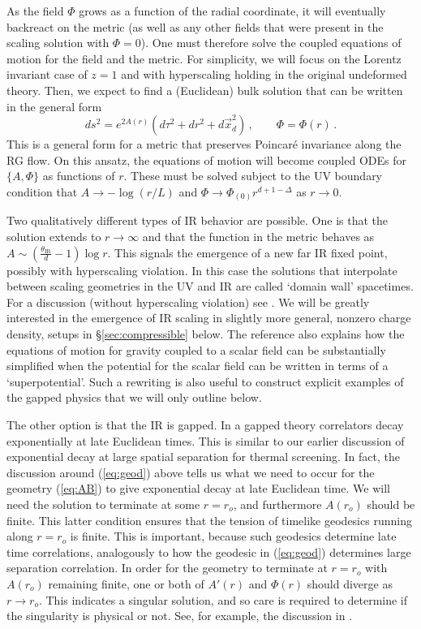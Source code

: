 \documentclass[10pt, oneside]{book}
\def\be{\begin{equation}}
\def\ee{\end{equation}}
\begin{document}
\begin{doublespace}
As the field $\Phi$ grows as a function of the radial coordinate, it will eventually backreact on the metric (as well as any other fields that were present in the scaling solution with $\Phi = 0$). One must therefore solve the coupled equations of motion for the field and the metric. For simplicity, we will focus on the Lorentz invariant case of $z=1$ and with hyperscaling holding in the original undeformed theory. Then, we expect to find a (Euclidean) bulk solution that can be written in the general form 
\be\label{eq:AB}
ds^2 = e^{2 A(r)} \left(d\tau^2 + dr^2 + d\vec x^2_{d} \right) \,, \qquad \Phi = \Phi(r) \,.
\ee
This is a general form for a metric that preserves Poincar\'e invariance along the RG flow. On this ansatz, the equations of motion will become coupled ODEs for $\{A, \Phi\}$ as functions of $r$. These must be solved subject to the UV boundary condition that $A \to - \log (r/L)$ and $\Phi \to \Phi_{(0)} r^{d+1 - \Delta}$ as $r \to 0$.

Two qualitatively different types of IR behavior are possible. One is that the solution extends to $r \to \infty$ and that the function in the metric behaves as $A \sim (\frac{\theta_\text{IR}}{d} - 1) \log r$. This signals the emergence of a new far IR fixed point, possibly with hyperscaling violation. In this case the solutions that interpolate between scaling geometries in the UV and IR are called `domain wall' spacetimes. For a discussion (without hyperscaling violation) see \cite{Skenderis:1999mm}. We will be greatly interested in the emergence of IR scaling in slightly more general, nonzero charge density, setups in \S\ref{sec:compressible} below. The reference \cite{Skenderis:1999mm} also explains how the equations of motion for gravity coupled to a scalar field can be substantially simplified when the potential for the scalar field can be written in terms of a `superpotential'. Such a rewriting is also useful to construct explicit examples of the gapped physics that we will only outline below. 

The other option is that the IR is gapped. In a gapped theory correlators decay exponentially at late Euclidean times. This is similar to our earlier discussion of exponential decay at large spatial separation for thermal screening. In fact, the discussion around (\ref{eq:geod}) above tells us what we need to occur for the geometry (\ref{eq:AB}) to give exponential decay at late Euclidean time.
We will need the solution to terminate at some $r = r_o$, and furthermore $A(r_o)$ should be finite. This latter condition ensures that the tension of timelike geodesics running along $r = r_o$ is finite. This is important, because such geodesics determine late time correlations, analogously to how the geodesic in (\ref{eq:geod}) determines large separation correlation. In order for the geometry to terminate at $r=r_o$ with $A(r_o)$ remaining finite, one or both of $A'(r)$ and $\Phi(r)$ should diverge as $r \to r_o$. This indicates a singular solution, and so care is required to determine if the singularity is physical or not. See, for example, the discussion in \cite{Gubser:2000nd}.


\end{doublespace}
\end{document}

